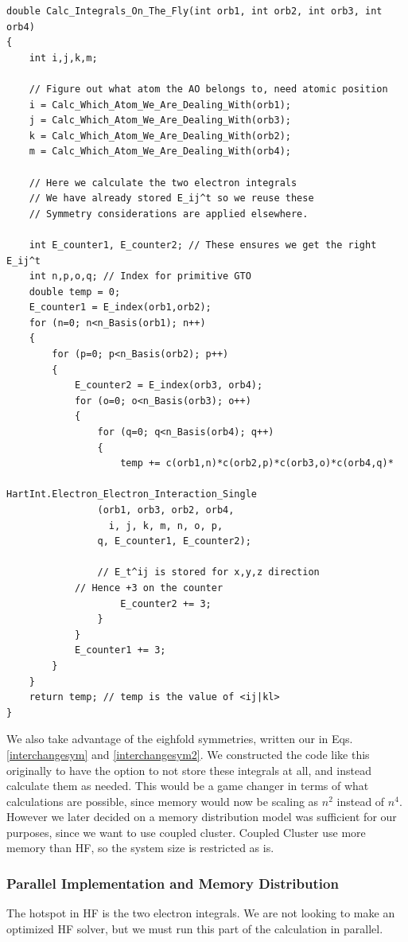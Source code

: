 \documentclass[a4paper,norsk,11pt,twoside]{report}
\begin{document}
\begin{lstlisting}
double Calc_Integrals_On_The_Fly(int orb1, int orb2, int orb3, int orb4)
{    
    int i,j,k,m;

    // Figure out what atom the AO belongs to, need atomic position
    i = Calc_Which_Atom_We_Are_Dealing_With(orb1);
    j = Calc_Which_Atom_We_Are_Dealing_With(orb3);
    k = Calc_Which_Atom_We_Are_Dealing_With(orb2);
    m = Calc_Which_Atom_We_Are_Dealing_With(orb4);

    // Here we calculate the two electron integrals
    // We have already stored E_ij^t so we reuse these
    // Symmetry considerations are applied elsewhere.

    int E_counter1, E_counter2; // These ensures we get the right E_ij^t
    int n,p,o,q; // Index for primitive GTO
    double temp = 0;
    E_counter1 = E_index(orb1,orb2);
    for (n=0; n<n_Basis(orb1); n++)
    {
        for (p=0; p<n_Basis(orb2); p++)
        {
            E_counter2 = E_index(orb3, orb4);
            for (o=0; o<n_Basis(orb3); o++)
            {
                for (q=0; q<n_Basis(orb4); q++)
                {
                    temp += c(orb1,n)*c(orb2,p)*c(orb3,o)*c(orb4,q)*
                            HartInt.Electron_Electron_Interaction_Single
                (orb1, orb3, orb2, orb4,
                  i, j, k, m, n, o, p,
                q, E_counter1, E_counter2);

                // E_t^ij is stored for x,y,z direction
            // Hence +3 on the counter
                    E_counter2 += 3;
                }
            }
            E_counter1 += 3;
        }
    }
    return temp; // temp is the value of <ij|kl>
}
\end{lstlisting}



We also take advantage of the eighfold symmetries, written our in Eqs. \eqref{interchangesym} and \eqref{interchangesym2}. We constructed the code like this originally to have the option to not store these integrals at all, and instead calculate them as needed. This would be a game changer in terms of what calculations are possible, since memory would now be scaling as $n^2$ instead of $n^4$. However we later decided on a memory distribution model was sufficient for our purposes, since we want to use coupled cluster. Coupled Cluster use more memory than HF, so the system size is restricted as is. 

\subsubsection{Parallel Implementation and Memory Distribution}
The hotspot in HF is the two electron integrals. We are not looking to make an optimized HF solver, but we must run this part of the calculation in parallel. \\
\end{document}
